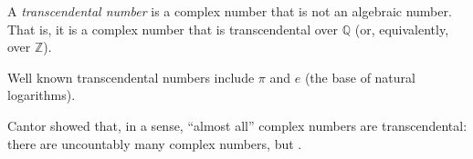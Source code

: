 \documentclass[12pt]{article}
\def\Q{\mathbb{Q}}
\def\Z{\mathbb{Z}}
\begin{document}
A \emph{transcendental number} is a complex number
that is not an algebraic number.
That is, it is a complex number that is transcendental over $\Q$
(or, equivalently, over $\Z$).

Well known transcendental numbers include $\pi$ and $e$
(the base of natural logarithms).

Cantor showed that, in a sense,
``almost all'' complex numbers are transcendental:
there are uncountably many complex numbers, but
.

\end{document}
